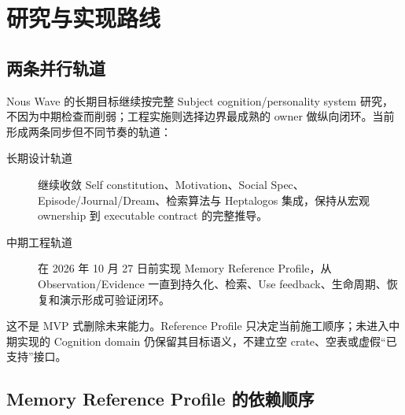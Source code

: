 \chapter{研究与实现路线}

\section{两条并行轨道}

Nous Wave 的长期目标继续按完整 Subject cognition/personality system 研究，不因为中期检查而削弱；工程实施则选择边界最成熟的 owner 做纵向闭环。当前形成两条同步但不同节奏的轨道：

\begin{description}
\item[长期设计轨道] 继续收敛 Self constitution、Motivation、Social Spec、Episode/Journal/Dream、检索算法与 Heptalogos 集成，保持从宏观 ownership 到 executable contract 的完整推导。
\item[中期工程轨道] 在 2026 年 10 月 27 日前实现 Memory Reference Profile，从 Observation/Evidence 一直到持久化、检索、Use feedback、生命周期、恢复和演示形成可验证闭环。
\end{description}

这不是 MVP 式删除未来能力。Reference Profile 只决定当前施工顺序；未进入中期实现的 Cognition domain 仍保留其目标语义，不建立空 crate、空表或虚假“已支持”接口。

\section{Memory Reference Profile 的依赖顺序}

